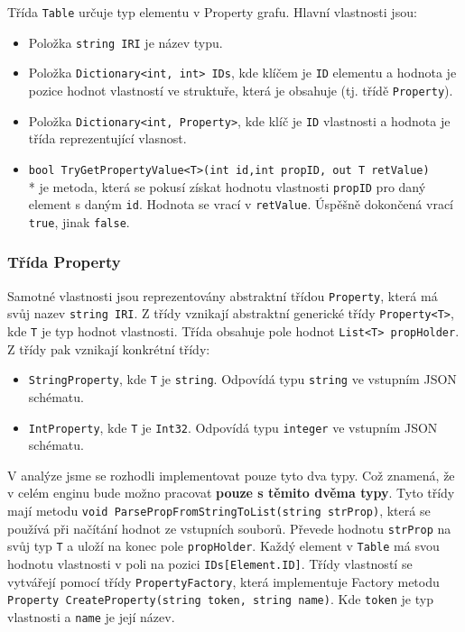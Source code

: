 Třída \texttt{Table} určuje typ elementu v Property grafu.
Hlavní vlastnosti jsou:
\begin{itemize}
\item Položka \texttt{string IRI} je název typu.
\item Položka \texttt{Dictionary<int, int> IDs}, kde klíčem je \texttt{ID} elementu a hodnota je pozice hodnot vlastností ve struktuře, která je obsahuje (tj. třídě \texttt{Property}).
\item Položka \texttt{Dictionary<int, Property>}, kde klíč je \texttt{ID} vlastnosti a hodnota je třída reprezentující vlasnost.
\item \texttt{bool TryGetPropertyValue<T>(int id,int propID, out T retValue)}\\* 
je metoda, která se pokusí získat hodnotu vlastnosti \texttt{propID} pro daný element s daným \texttt{id}.
Hodnota se vrací v \texttt{retValue}. Úspěšně dokončená vrací \texttt{true}, jinak \texttt{false}.
\end{itemize}

\subsubsection{Třída Property}

Samotné vlastnosti jsou reprezentovány abstraktní třídou \texttt{Property}, která má svůj nazev \texttt{string IRI}.
Z třídy vznikají abstraktní generické třídy \texttt{Property<T>}, kde \texttt{T} je typ hodnot vlastnosti.
Třída obsahuje pole hodnot \texttt{List<T> propHolder}.
Z třídy pak vznikají konkrétní třídy:
\begin{itemize}
\item \texttt{StringProperty}, kde \texttt{T} je \texttt{string}. Odpovídá typu \texttt{string} ve vstupním JSON schématu.
\item \texttt{IntProperty}, kde \texttt{T} je \texttt{Int32}. Odpovídá typu \texttt{integer} ve vstupním JSON schématu.
\end{itemize}
V analýze jsme se rozhodli implementovat pouze tyto dva typy. 
Což znamená, že v celém enginu bude možno pracovat \textbf{pouze s těmito dvěma typy}.
Tyto třídy mají metodu \texttt{void ParsePropFromStringToList(string strProp)}, která se používá při načítání hodnot ze vstupních souborů.
Převede hodnotu \texttt{strProp} na svůj typ \texttt{T} a uloží na konec pole \texttt{propHolder}.
Každý element v \texttt{Table} má svou hodnotu vlastnosti v poli na pozici \texttt{IDs[Element.ID]}.
Třídy vlastností se vytvářejí pomocí třídy \texttt{PropertyFactory}, která implementuje Factory metodu \citep[str. 107]{patterns} \texttt{Property CreateProperty(string token, string name)}.
Kde \texttt{token} je typ vlastnosti a \texttt{name} je její název.

